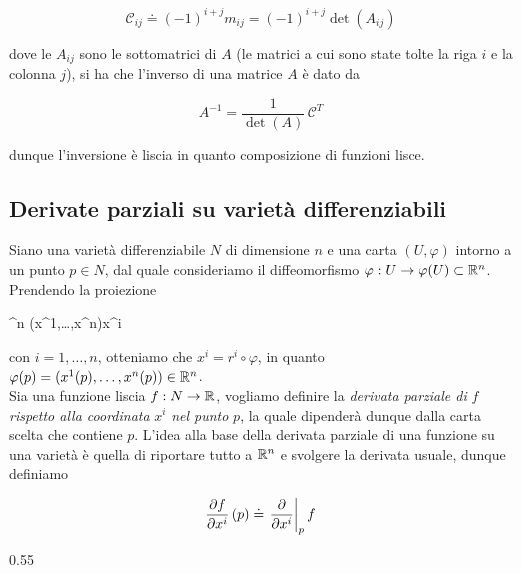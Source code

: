 \begin{equation}
	\mathcal{C}_{ij} \doteq (-1)^{i+j} m_{ij} = (-1)^{i+j} \det(A_{ij})
\end{equation}

dove le $ A_{ij} $ sono le sottomatrici di $ A $ (le matrici a cui sono state tolte la riga $ i $ e la colonna $ j $), si ha che l'inverso di una matrice $ A $ è dato da

\begin{equation}
	A^{-1} = \dfrac{1}{\det(A)} \, \mathcal{C}^{T}
\end{equation}

dunque l'inversione è liscia in quanto composizione di funzioni lisce.

\subsection{Derivate parziali su varietà differenziabili}

Siano una varietà differenziabile $ N $ di dimensione $ n $ e una carta $ (U,\varphi) $ intorno a un punto $ p \in N $, dal quale consideriamo il diffeomorfismo $ \varphi : U \to \varphi(U) \subset \mathbb{R}^{n} $. Prendendo la proiezione

	{\R^{n}}{\R}
	{(x^{1},\dots,x^{n})}{x^{i}}

con $ i=1,\dots,n $, otteniamo che $ x^{i} = r^{i} \circ \varphi $, in quanto $ \varphi(p) = (x^{1}(p),\dots,x^{n}(p)) \in \mathbb{R}^{n} $. \\
Sia una funzione liscia $ f : N \to \mathbb{R} $, vogliamo definire la \textit{derivata parziale di} $ f $ \textit{rispetto alla coordinata} $ x^{i} $ \textit{nel punto} $ p $, la quale dipenderà dunque dalla carta scelta che contiene $ p $. L'idea alla base della derivata parziale di una funzione su una varietà è quella di riportare tutto a $ \mathbb{R}^{n} $ e svolgere la derivata usuale, dunque definiamo

\begin{equation}
	\pdv{f}{x^{i}} \, (p) \doteq \eval{ \pdv{x^{i}} }_{p} f
\end{equation}

	{0.55}{%
			}

